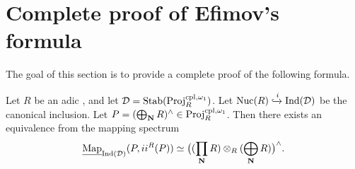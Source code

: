 \documentclass[a4paper,10pt, oneside]{amsart}
\begin{document}
\section{Complete proof of Efimov's formula}\label{appen3}
The goal of this section is to provide a complete proof of the following formula.

\begin{prop}\label{appenc1}
	Let $R$ be an adic \einfring, and let $\mathcal{D}=\mathrm{Stab}(\mathrm{Proj}_R^{\mathrm{cpl},\omega_1})$. Let $\mathrm{Nuc}(R)\xhookrightarrow{i}\mathrm{Ind}(\mathcal{D})$ be the canonical inclusion. Let $P=(\bigoplus_{\mathbf{N}} R)^{\wedge}\in \mathrm{Proj}_R^{\mathrm{cpl},\omega_1}$. Then there exists an equivalence from the mapping spectrum $$\underline{\operatorname{Map}}_{\mathrm{Ind}(\mathcal{D})}(P,ii^R(P))\simeq \big((\prod_{\mathbf{N}} R)\otimes_R (\bigoplus_{\mathbf{N}} R)\big)^\wedge.$$
\end{prop}
\end{document}
